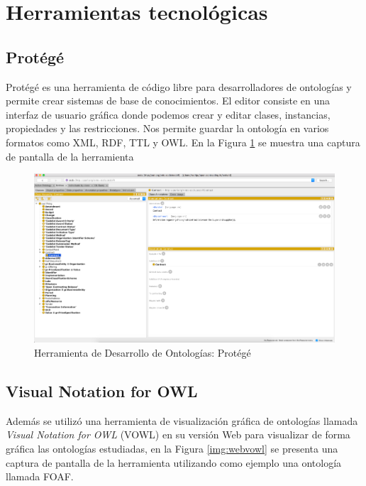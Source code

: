 \section{Herramientas tecnológicas}
\subsection{Protégé}
Protégé es una herramienta de código libre para desarrolladores de ontologías y permite crear sistemas de base de conocimientos. El editor consiste en una interfaz de usuario gráfica donde podemos crear y editar clases, instancias, propiedades y las restricciones. Nos permite guardar la ontología en varios formatos como XML, RDF, TTL y OWL. En la Figura \ref{img:protege} se muestra una captura de pantalla de la herramienta

\begin{figure}[h!]
    \centering
    \includegraphics[width=150mm]{figuras/protege}
    \caption{Herramienta de Desarrollo de Ontologías: Protégé}
    \label{img:protege}
    \end{figure}

\subsection{Visual Notation for OWL}
Además se utilizó una herramienta de visualización gráfica de ontologías llamada \textit{Visual Notation for OWL} (VOWL) en su versión Web para visualizar de forma gráfica las ontologías estudiadas, en la Figura \ref{img:webvowl} se presenta una captura de pantalla de la herramienta utilizando como ejemplo una ontología llamada FOAF.

